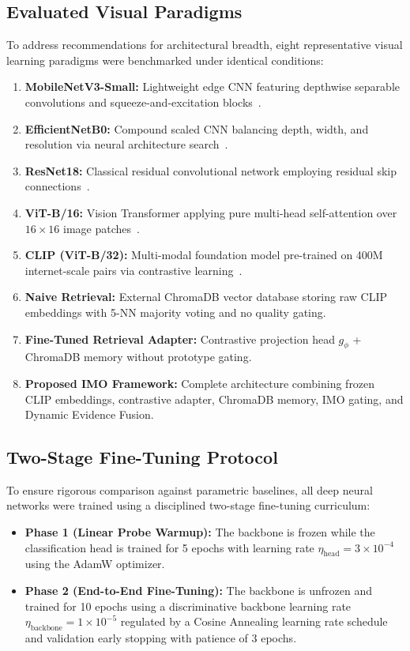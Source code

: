 \documentclass[sn-mathphys,Numbered]{sn-jnl}
\begin{document}
\subsection{Evaluated Visual Paradigms}
To address recommendations for architectural breadth, eight representative visual learning paradigms were benchmarked under identical conditions:
\begin{enumerate}
    \item \textbf{MobileNetV3-Small:} Lightweight edge CNN featuring depthwise separable convolutions and squeeze-and-excitation blocks~\cite{howard2019searching}.
    \item \textbf{EfficientNetB0:} Compound scaled CNN balancing depth, width, and resolution via neural architecture search~\cite{tan2019efficientnet}.
    \item \textbf{ResNet18:} Classical residual convolutional network employing residual skip connections~\cite{he2016deep}.
    \item \textbf{ViT-B/16:} Vision Transformer applying pure multi-head self-attention over $16 \times 16$ image patches~\cite{dosovitskiy2020image}.
    \item \textbf{CLIP (ViT-B/32):} Multi-modal foundation model pre-trained on 400M internet-scale pairs via contrastive learning~\cite{radford2021learning}.
    \item \textbf{Naive Retrieval:} External ChromaDB vector database storing raw CLIP embeddings with 5-NN majority voting and no quality gating.
    \item \textbf{Fine-Tuned Retrieval Adapter:} Contrastive projection head $g_\phi$ + ChromaDB memory without prototype gating.
    \item \textbf{Proposed IMO Framework:} Complete architecture combining frozen CLIP embeddings, contrastive adapter, ChromaDB memory, IMO gating, and Dynamic Evidence Fusion.
\end{enumerate}

\subsection{Two-Stage Fine-Tuning Protocol}
To ensure rigorous comparison against parametric baselines, all deep neural networks were trained using a disciplined two-stage fine-tuning curriculum:
\begin{itemize}
    \item \textbf{Phase 1 (Linear Probe Warmup):} The backbone is frozen while the classification head is trained for 5 epochs with learning rate $\eta_{\text{head}} = 3 \times 10^{-4}$ using the AdamW optimizer.
    \item \textbf{Phase 2 (End-to-End Fine-Tuning):} The backbone is unfrozen and trained for 10 epochs using a discriminative backbone learning rate $\eta_{\text{backbone}} = 1 \times 10^{-5}$ regulated by a Cosine Annealing learning rate schedule and validation early stopping with patience of 3 epochs.
\end{itemize}
\end{document}
